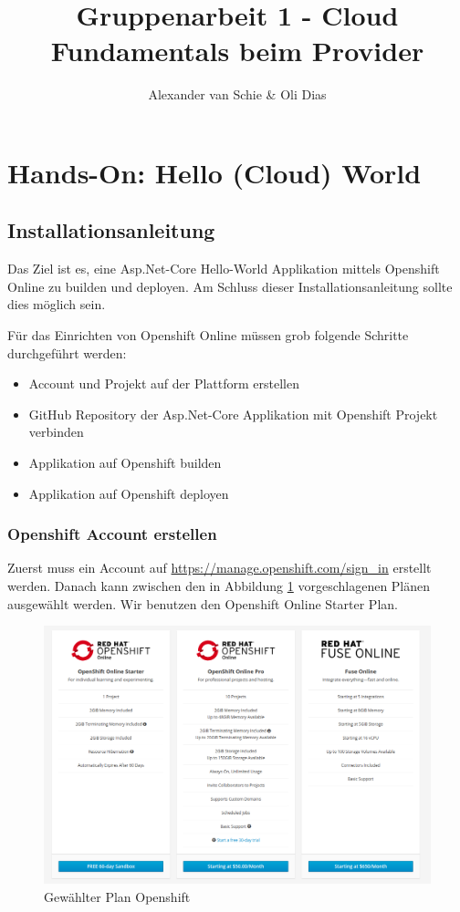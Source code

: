 \documentclass[12pt,a4paper]{article}
\author{Alexander van Schie \& Oli Dias}
\title{Gruppenarbeit 1 - Cloud Fundamentals beim Provider}
\begin{document}
\maketitle
\newpage
\tableofcontents
\newpage
\section{Hands-On: Hello (Cloud) World}
\subsection{Installationsanleitung}
Das Ziel ist es, eine Asp.Net-Core Hello-World Applikation mittels Openshift Online zu builden und deployen. Am Schluss dieser Installationsanleitung sollte dies möglich sein.


Für das Einrichten von Openshift Online müssen grob folgende Schritte durchgeführt werden:
\begin{itemize}
	\item Account und Projekt auf der Plattform erstellen
	\item GitHub Repository der Asp.Net-Core Applikation mit Openshift Projekt verbinden
	\item Applikation auf Openshift builden
	\item Applikation auf Openshift deployen
\end{itemize}
\subsubsection{Openshift Account erstellen}
Zuerst muss ein Account auf  \url{https://manage.openshift.com/sign_in} erstellt werden. Danach kann zwischen den in Abbildung \ref{fig:openshift-plan} vorgeschlagenen Plänen ausgewählt werden. Wir benutzen den Openshift Online Starter Plan.
\begin{figure}[h]
	\centering
	\includegraphics[width=0.7\linewidth]{img/openshift-plan}
	\caption{Gewählter Plan Openshift}
	\label{fig:openshift-plan}
\end{figure}
\end{document}
